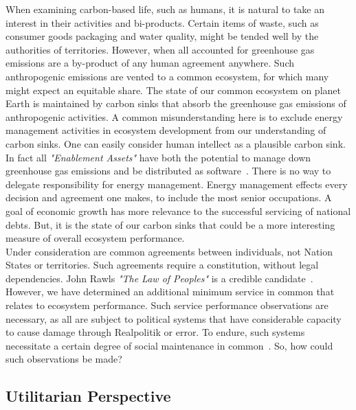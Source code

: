 \documentclass[11pt, oneside]{article}   	%
\begin{document}
When examining carbon-based life, such as humans, it is natural to take an interest in their activities and bi-products.
Certain items of waste, such as consumer goods packaging and water quality, might be tended well by the authorities of territories.
However, when all accounted for greenhouse gas emissions are a by-product of any human agreement anywhere.
Such anthropogenic emissions are vented to a common ecosystem, for which many might expect an equitable share.
The state of our common ecosystem on planet Earth is maintained by carbon sinks that absorb the greenhouse gas emissions of anthropogenic activities.
A common misunderstanding here is to exclude energy management activities in ecosystem development from our understanding of carbon sinks.
One can easily consider human intellect as a plausible carbon sink.
In fact all \emph{"Enablement Assets"} have both the potential to manage down greenhouse gas emissions and be distributed as software~\cite{pd3}.
There is no way to delegate responsibility for energy management.
Energy management effects every decision and agreement one makes, to include the most senior occupations.
A goal of economic growth has more relevance to the successful servicing of national debts.
But, it is the state of our carbon sinks that could be a more interesting measure of overall ecosystem performance.\\

Under consideration are common agreements between individuals, not Nation States or territories.
Such agreements require a constitution, without legal dependencies.
John Rawls \emph{"The Law of Peoples"} is a credible candidate~\cite{jr2}.
However, we have determined an additional minimum service in common that relates to ecosystem performance.
Such service performance observations are necessary, as all are subject to political systems that have considerable capacity to cause damage through Realpolitik or error.
To endure, such systems necessitate a certain degree of social maintenance in common~\cite{rc1}.
So, how could such observations be made?

\subsection{Utilitarian Perspective}
\end{document}
